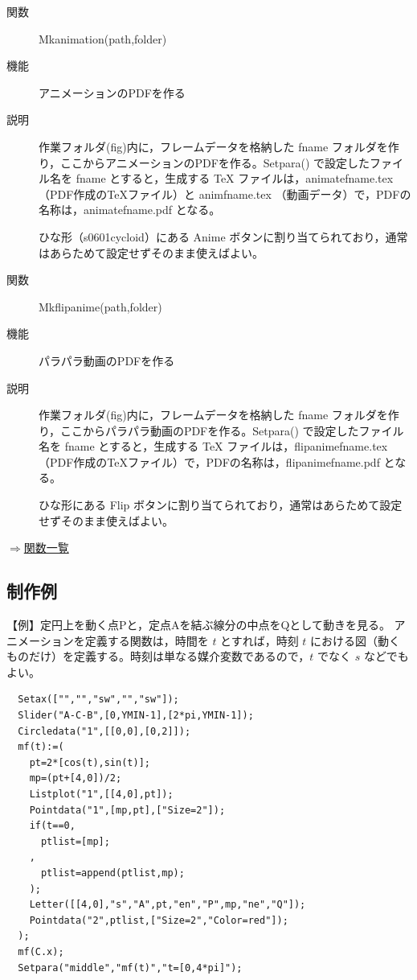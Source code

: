\documentclass[papersize,a4paper,12pt,uplatex]{jsarticle}
\begin{document}
\begin{description}
\vspace{\baselineskip}
\item[関数]  Mkanimation(path,folder)
\item[機能]  アニメーションのPDFを作る
\item[説明]  作業フォルダ(fig)内に，フレームデータを格納した fname フォルダを作り，ここからアニメーションのPDFを作る。Setpara() で設定したファイル名を fname とすると，生成する TeX ファイルは，animatefname.tex （PDF作成のTeXファイル）と animfname.tex （動画データ）で，PDFの名称は，animatefname.pdf となる。

ひな形（s0601cycloid）にある Anime ボタンに割り当てられており，通常はあらためて設定せずそのまま使えばよい。

\vspace{\baselineskip}
\item[関数]  Mkflipanime(path,folder)
\item[機能]  パラパラ動画のPDFを作る
\item[説明]  作業フォルダ(fig)内に，フレームデータを格納した fname フォルダを作り，ここからパラパラ動画のPDFを作る。Setpara() で設定したファイル名を fname とすると，生成する TeX ファイルは，flipanimefname.tex （PDF作成のTeXファイル）で，PDFの名称は，flipanimefname.pdf となる。

ひな形にある Flip ボタンに割り当てられており，通常はあらためて設定せずそのまま使えばよい。

\end{description}

\begin{flushright}  \hyperlink{functionlist}{$\Rightarrow$関数一覧}\end{flushright}

\subsection{制作例}

\vspace{\baselineskip}
【例】定円上を動く点Pと，定点Aを結ぶ線分の中点をQとして動きを見る。
アニメーションを定義する関数は，時間を $t$ とすれば，時刻 $t$ における図（動くものだけ）を定義する。時刻は単なる媒介変数であるので，$t$ でなく $s$ などでもよい。

\begin{verbatim}
  Setax(["","","sw","","sw"]);
  Slider("A-C-B",[0,YMIN-1],[2*pi,YMIN-1]);
  Circledata("1",[[0,0],[0,2]]);
  mf(t):=(
    pt=2*[cos(t),sin(t)];
    mp=(pt+[4,0])/2;
    Listplot("1",[[4,0],pt]);
    Pointdata("1",[mp,pt],["Size=2"]);
    if(t==0,
      ptlist=[mp];
    ,
      ptlist=append(ptlist,mp);
    );
    Letter([[4,0],"s","A",pt,"en","P",mp,"ne","Q"]);
    Pointdata("2",ptlist,["Size=2","Color=red"]);
  );
  mf(C.x);
  Setpara("middle","mf(t)","t=[0,4*pi]");
\end{verbatim}
\end{document}
